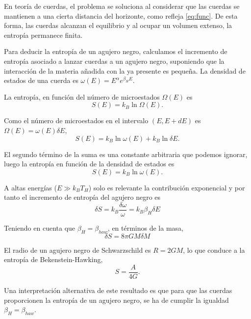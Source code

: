 En teoría de cuerdas, el problema se soluciona al considerar que las cuerdas se mantienen a
una cierta distancia del horizonte, como refleja \ref{eq:func}.
De esta forma, las cuerdas alcanzan el equilibrio y al ocupar un volumen extenso, la entropía
permanece finita.

Para deducir la entropía de un agujero negro, calculamos el incremento de entropía asociado 
a lanzar cuerdas a un agujero negro, suponiendo que la interacción de la materia añadida con la
ya presente es pequeña. 
La densidad de estados de una cuerda es
$\omega(E) = E^\alpha e^{\beta_H E}$.

La entropía, en función del número de microestados $\Omega(E)$ es 
\begin{equation}
  S(E) = k_B\ln\Omega(E).
\end{equation}

Como el número de microestados en el intervalo $(E,E+dE)$ es $\Omega(E) = \omega(E)\delta E$,
\begin{equation}
  S(E) = k_B \ln \omega(E) + k_B \ln \delta E.
\end{equation}

El segundo término de la suma es una constante arbitraria que podemos ignorar, luego
la entropía en función de la densidad de estados es
\begin{equation}
  S(E) = k_B \ln \omega(E).
\end{equation}

A altas energías ($E \gg k_B T_H$) solo es relevante la contribución exponencial y por 
tanto el incremento de entropía del agujero negro es
\begin{equation}
  \delta S = k_B  \frac{\delta \omega}{\omega} = k_B \beta_H \delta E
\end{equation}

Teniendo en cuenta que $\beta_H = \beta_{haw}$, en términos de la masa,
\begin{equation}
  \delta S =  8\pi GM\delta M
\end{equation}

El radio de un agujero negro de Schwarzschild es $R=2GM$, lo que conduce a la entropía
de Bekenstein-Hawking,
\begin{equation}
  S=\frac{A}{4G}.
\end{equation}

Una interpretación alternativa de este resultado es que para que las cuerdas proporcionen
la entropía de un agujero negro, se ha de cumplir la igualdad $\beta_H = \beta_{haw}$.
